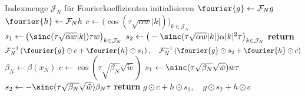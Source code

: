 \begin{algorithm}[ht]
\begin{algorithmic}[1]
        	\State Indexmenge $\mathcal{J}_N$ für Fourierkoeffizienten initialisieren
        	\State $\fourier{g}\gets \mathcal{F}_Ng$
        	\State $\fourier{h}\gets \mathcal{F}_Nh$
        	\State $c\gets \big(\cos(\tau\sqrt{\alpha w}|k|)\big)_{k\in\mathcal{J}_N}$
        	\State $s_1\gets \big(\sinc(\tau\sqrt{\alpha w}|k|)\tau w\big)_{k\in\mathcal{J}_N}$
        	\State $s_2\gets \big(-\sinc(\tau\sqrt{\alpha w}|k|)\alpha|k|^2\tau\big)_{k\in\mathcal{J}_N}$
            \State \textbf{return} $\mathcal{F}_N^{-1}\left(\fourier{g}\odot c+\fourier{h}\odot s_1\right),\quad \mathcal{F}_N^{-1}\left(\fourier{g}\odot s_2+\fourier{h}\odot c\right)$
        \EndFunction
        	\State $\beta_N\gets\beta(x_N)$
        	\State $c\gets \cos(\tau\sqrt{\beta_N}\sqrt{\tilde{w}})$
        	\State $s_1\gets \sinc(\tau\sqrt{\beta_N}\sqrt{\tilde{w}})\tilde{w}\tau$
        	\State $s_2\gets -\sinc(\tau\sqrt{\beta_N}\sqrt{\tilde{w}})\beta_N\tau$
        	\State \textbf{return} $g\odot c+h\odot s_1,\quad g\odot s_2+h\odot c$
        \EndFunction
    \end{algorithmic}
\end{algorithm}

